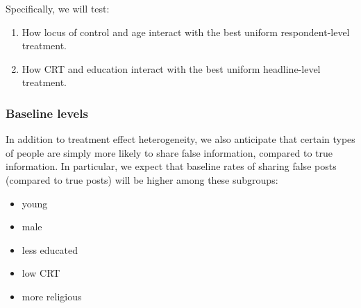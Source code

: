 \documentclass[letterpaper, 12pt, parskip=full,]{scrartcl}
\begin{document}
Specifically, we will test:
\begin{enumerate}
\item How locus of control and age interact with the best uniform respondent-level treatment. 
\item How CRT and education interact with the best uniform headline-level treatment. 
\end{enumerate}


\subsubsection{Baseline levels}\label{baseline_levels}
In addition to treatment effect heterogeneity, we also anticipate that certain types of people are simply more likely to share false information, compared to true information. In particular, we expect that baseline rates of sharing false posts (compared to true posts) will be higher among these subgroups:
\begin{itemize}
\item young
\item male
\item less educated
\item low CRT
\item more religious
\end{itemize}

\end{document}
